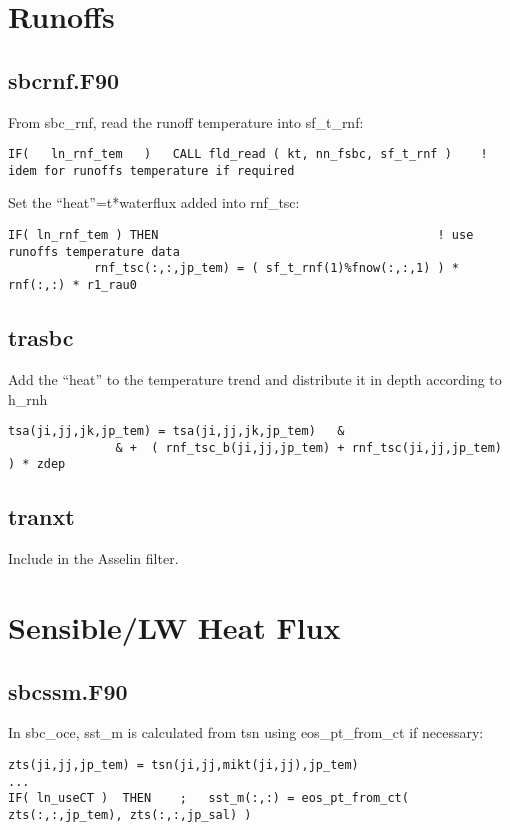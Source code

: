 \documentclass{article}
\begin{document}
\section*{Runoffs}

 \subsection*{sbcrnf.F90}

From sbc\_rnf, read the runoff temperature into sf\_t\_rnf:
\begin{verbatim}
IF(   ln_rnf_tem   )   CALL fld_read ( kt, nn_fsbc, sf_t_rnf )    ! idem for runoffs temperature if required
\end{verbatim}

Set the ``heat''=t*waterflux added into rnf\_tsc:
\begin{verbatim}
IF( ln_rnf_tem ) THEN                                       ! use runoffs temperature data
            rnf_tsc(:,:,jp_tem) = ( sf_t_rnf(1)%fnow(:,:,1) ) * rnf(:,:) * r1_rau0
\end{verbatim}

\subsection*{trasbc}
Add the ``heat'' to the temperature trend and distribute it in depth according to h\_rnh
\begin{verbatim}
tsa(ji,jj,jk,jp_tem) = tsa(ji,jj,jk,jp_tem)   &
               & +  ( rnf_tsc_b(ji,jj,jp_tem) + rnf_tsc(ji,jj,jp_tem) ) * zdep
\end{verbatim}

\subsection*{tranxt}
Include in the Asselin filter.

\section*{Sensible/LW Heat Flux}

\subsection*{sbcssm.F90}

In sbc\_oce, sst\_m is calculated from tsn using eos\_pt\_from\_ct if necessary:
\begin{verbatim}
zts(ji,jj,jp_tem) = tsn(ji,jj,mikt(ji,jj),jp_tem)
...
IF( ln_useCT )  THEN    ;   sst_m(:,:) = eos_pt_from_ct( zts(:,:,jp_tem), zts(:,:,jp_sal) )
\end{verbatim}
\end{document}
